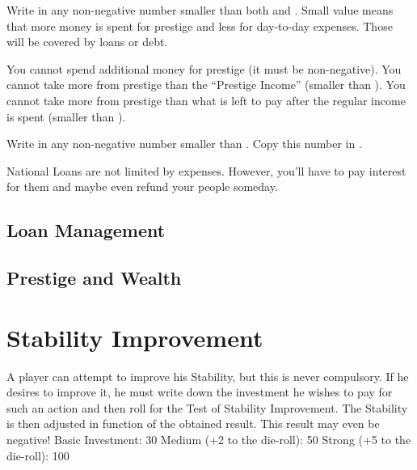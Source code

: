  Write in  any non-negative
number smaller than both  and
.
\bparag Small value means that more money is spent for prestige \VPs and less
for day-to-day expenses. Those will be covered by loans or debt.

\begin{designnote}
  You cannot spend additional money for prestige (it must be non-negative).
  You cannot take more from prestige than the ``Prestige Income'' (smaller
  than ).  You cannot take more from prestige
  than what is left to pay after the regular income is spent (smaller than
  ).
\end{designnote}

 Write in  any non-negative
number smaller than .
\bparag Copy this number in .

\begin{designnote}
  National Loans are not limited by expenses. However, you'll have to pay
  interest for them and maybe even refund your people someday.
\end{designnote}

\subsection{Loan Management}

\subsection{Prestige and Wealth}\label{chPeace:Prestige and Wealth}
\section{Stability Improvement}\label{chPeace:Stability Improvement}

\label{chPeace:Stability Improvement}
\aparag A player can attempt to improve his Stability, but this is never
compulsory. If he desires to improve it, he must write down the investment he
wishes to pay for such an action and then roll for the Test of Stability
Improvement. The Stability is then adjusted in function of the obtained
result. This result may even be negative!
\aparag[Investment]
\bparag Basic Investment: 30 \ducats
\bparag Medium (+2 to the die-roll): 50 \ducats
\bparag Strong (+5 to the die-roll): 100 \ducats

